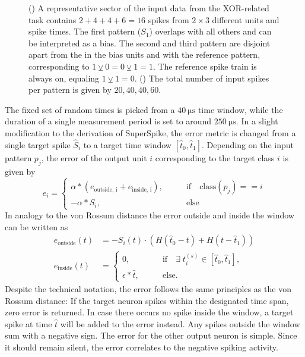 \begin{figure}
	\begin{subfigure}{0.5\textwidth}
		\caption{}
		
		\label{superspiketaskpicturesector}
	\end{subfigure}
	\begin{subfigure}{0.5\textwidth}
		\caption{}
		
		\label{superspiketaskpicture}
	\end{subfigure}
	\caption{() A representative sector of the input data from the XOR-related task contains $2 + 4 + 4 + 6 = 16$ spikes from $2\times3$ different units and spike times. The first pattern ($S_1$) overlaps with all others and can be interpreted as a bias. The second and third pattern are disjoint apart from the  in the bias units and with the reference pattern, corresponding to $1 \veebar 0 = 0 \veebar 1 = 1$. The reference spike train is always on, equaling $1 \veebar 1 = 0$. () The total number of input spikes per pattern is given by $20, 40, 40, 60$.
	\label{superspiketaskoverview}}
\end{figure} 

The fixed set of random times is picked from a $\SI{40}{\micro \s}$ time window, while the duration of a single measurement period is set to around $\SI{250}{\micro \s}$. In a slight modification to the derivation of SuperSpike, the error metric is changed from a single target spike $\hat{S}_i$ to a target time window $[\hat{t}_0, \hat{t}_1]$. Depending on the input pattern $p_j$, the error of the output unit $i$ corresponding to the target class $i$ is given by
\begin{equation}
e_i = \begin{cases}
\alpha \ast \left(e_\text{outside, i} + e_\text{inside, i}\right),& \quad \quad \text{if} \quad \text{class}(p_j) == i \\
- \alpha \ast S_i,& \quad \quad \text{else} 
\end{cases}
\end{equation}
In analogy to the von Rossum distance the error outside and inside the window can be written as 
\begin{align}
e_\text{outside}(t) &= - S_i(t) \cdot \left(H(\hat{t}_0 - t) + H(t - \hat{t}_1)\right) \\
e_\text{inside}(t) &= 
\begin{cases}
0 ,&\quad \quad \text{if} \quad \exists \; t^{(s)}_i \in [\hat{t}_0, \hat{t}_1], \\
\epsilon \ast \hat{t} ,& \quad \quad \text{else}.
\end{cases}
\end{align}
Despite the technical notation, the error follows the same principles as the von Rossum distance: If the target neuron spikes within the designated time span, zero error is returned. In case there occurs no spike inside the window, a target spike at time $\hat{t}$ will be added to the error instead. Any spikes outside the window sum with a negative sign. The error for the other output neuron is simple. Since it should remain silent, the error correlates to the negative spiking activity.


